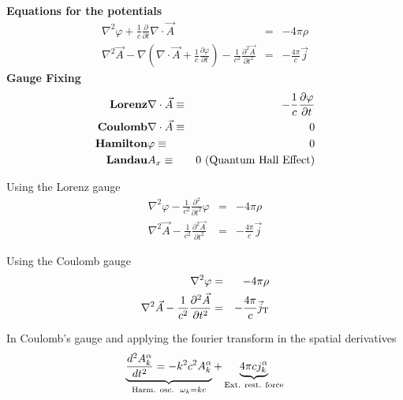 \documentclass[12pt,a4paper]{article}
\begin{document}
\textbf{Equations for the potentials}
\begin{eqnarray}
	\nabla^2 \varphi + \frac{1}{c}\frac{\partial}{\partial t}\nabla\cdot \vec{A} & = & -4\pi\rho \\
	\nabla^2\vec{A} - \nabla \left( \nabla\cdot \vec{A}+ \frac{1}{c}\frac{\partial \varphi}{\partial t}\right)-\frac{1}{c^2}\frac{\partial^2  \vec{A}}{\partial t^2} & = & -\frac{4\pi}{c}\vec{j}
\end{eqnarray}
\textbf{Gauge Fixing}
\begin{eqnarray}
	\text{\textbf{Lorenz}}& \nabla \cdot \vec{A} \equiv & - \frac{1}{c}\frac{\partial \varphi}{\partial t} \\
	\text{\textbf{Coulomb}}& \nabla \cdot \vec{A} \equiv & 0\\
	\text{\textbf{Hamilton}} & \varphi \equiv & 0 \\
	\text{\textbf{Landau}} & A_x \equiv & 0 \text{ (Quantum Hall Effect)}
\end{eqnarray}

Using the Lorenz gauge
\begin{eqnarray}
\nabla^2 \varphi - \frac{1}{c^2}\frac{\partial^2}{\partial t^2}\varphi & = & -4\pi\rho \\
	\nabla^2\vec{A}-\frac{1}{c^2}\frac{\partial^2  \vec{A}}{\partial t^2} & = & -\frac{4\pi}{c}\vec{j}
\end{eqnarray}

Using the Coulomb gauge
\begin{eqnarray}
\nabla^2 \varphi  & = & -4\pi\rho \\
	\nabla^2\vec{A}-\frac{1}{c^2}\frac{\partial^2  \vec{A}}{\partial t^2} & = & -\frac{4\pi}{c}\vec{j}_{\rm  T}
\end{eqnarray}

In Coulomb's gauge and applying the fourier transform in the spatial derivatives
\begin{equation}
	\underbrace{\frac{d^2 A_k^{\alpha}}{dt^2}= -k^2c^2 A_k^{\alpha}}_{\text{Harm. osc.} \\ \omega_k = kc}  +  \underbrace{4\pi c j_k^{\alpha}}_{\text{Ext. rest. force}}
\end{equation}
\end{document}
